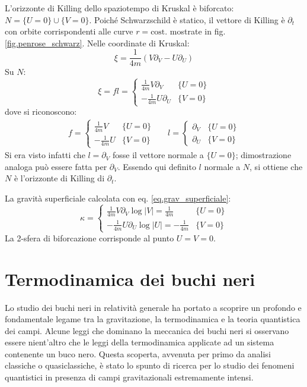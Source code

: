 \begin{esempio}
    L'orizzonte di Killing dello spaziotempo di Kruskal è biforcato: $N = \{U= 0\} \cup \{V=0\}$. Poiché Schwarzschild è statico, il vettore di Killing è $\partial_t$ con orbite corrispondenti alle curve $r = \textrm{cost.}$ mostrate in fig. \ref{fig.penrose_schwarz}. Nelle coordinate di Kruskal:
\begin{equation*}
        \xi = \frac{1}{4m}(V\partial_V - U \partial_U)
\end{equation*}
Su $N$:
\begin{equation*}
    \xi = fl= \left\{\begin{array}{cc}
         \frac{1}{4m}V\partial_V & \{U=0 \}  \\
         -\frac{1}{4m}U\partial_U & \{V=0 \} 
    \end{array}\right.
\end{equation*}
dove si riconoscono:
\begin{align*}
    f = \left\{\begin{array}{cc}
         \frac{1}{4m}V & \{U=0 \}  \\
         -\frac{1}{4m}U & \{V=0 \}
    \end{array}\right.
    &&
    l = \left\{\begin{array}{cc}
         \partial_V & \{U=0 \}  \\
         \partial_U & \{V=0 \}
    \end{array}\right.
\end{align*}
Si era visto infatti che $l=\partial_V$ fosse il vettore normale a $\{U=0 \}$; dimostrazione analoga può essere fatta per $\partial_V$. Essendo qui definito $l$ normale a $N$, si ottiene che $N$ è l'orizzonte di Killing di $\partial_t$.

La gravità superficiale calcolata con eq. \ref{eq.grav_superficiale}:
\begin{equation*}
    \kappa = \left\{ \begin{array}{cc}
         \frac{1}{4m}V \partial_V \log|V| = \frac{1}{4m} & \{U=0 \} \\
         - \frac{1}{4m}U \partial_U \log|U| = - \frac{1}{4m} & \{V=0 \}
    \end{array}\right.
\end{equation*}
La 2-sfera di biforcazione corrisponde al punto $U=V= 0$.
\end{esempio}

\section{Termodinamica dei buchi neri}
Lo studio dei buchi neri in relatività generale ha portato a scoprire un profondo e fondamentale legame tra la gravitazione, la termodinamica e la teoria quantistica dei campi. Alcune leggi che dominano la meccanica dei buchi neri si osservano essere nient'altro che le leggi della termodinamica applicate ad un sistema contenente un buco nero. Questa scoperta, avvenuta per primo da analisi classiche o quasiclassiche, è stato lo spunto di ricerca per lo studio dei fenomeni quantistici in presenza di campi gravitazionali estremamente intensi.

